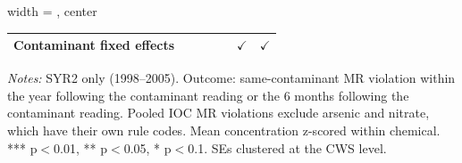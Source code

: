 \begin{table}[htbp]
\begin{adjustbox}{width = \textwidth, center}
\begin{tabular}{lcccccc}
      Contaminant fixed effects  &                   &                     &                   &                     & $\checkmark$      & $\checkmark$\\   
      \bottomrule
   \end{tabular}
\end{adjustbox}
{\tiny\linespread{1}\selectfont \par \raggedright \textit{Notes:} SYR2 only (1998--2005). Outcome: same-contaminant MR violation within the year following the contaminant reading or the 6 months following the contaminant reading. Pooled IOC MR violations exclude arsenic and nitrate, which have their own rule codes. Mean concentration z-scored within chemical. *** p$<$0.01, ** p$<$0.05, * p$<$0.1. SEs clustered at the CWS level.}
\end{table}
